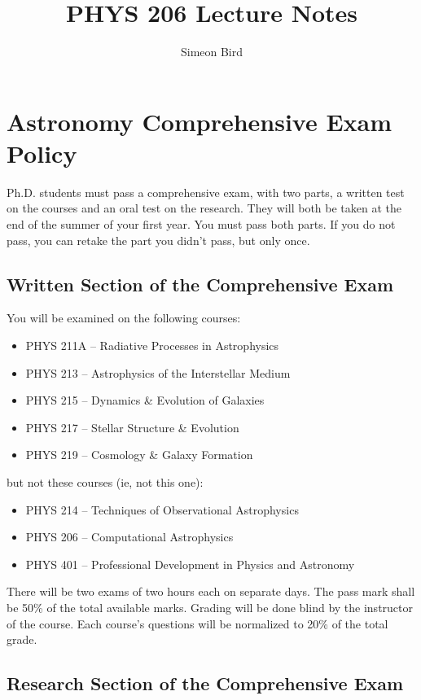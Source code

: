 \documentclass[12pt]{article}
\begin{document}
\title{PHYS 206 Lecture Notes}
\author{Simeon Bird}
\maketitle

\section{Astronomy Comprehensive Exam Policy}

Ph.D. students must pass a comprehensive exam, with two parts, a written test on the courses and an oral test on the research. They will both be taken at the end of the summer of your first year. You must pass both parts. If you do not pass, you can retake the part you didn't pass, but only once.

\subsection{Written Section of the Comprehensive Exam}

You will be examined on the following courses:
\begin{itemize}
  \item PHYS 211A – Radiative Processes in Astrophysics
  \item PHYS 213 – Astrophysics of the Interstellar Medium
  \item PHYS 215 – Dynamics \& Evolution of Galaxies
  \item PHYS 217 – Stellar Structure \& Evolution
  \item PHYS 219 – Cosmology \& Galaxy Formation
\end{itemize}

but not these courses (ie, not this one):
\begin{itemize}
  \item PHYS 214 – Techniques of Observational Astrophysics
  \item PHYS 206 – Computational Astrophysics
  \item PHYS 401 – Professional Development in Physics and Astronomy
\end{itemize}

There will be two exams of two hours each on separate days. The pass mark shall be 50\% of the total available marks. Grading will be done blind by the instructor of the course. Each course’s questions will be normalized to 20\% of the total grade.

\subsection{Research Section of the Comprehensive Exam}
\end{document}
